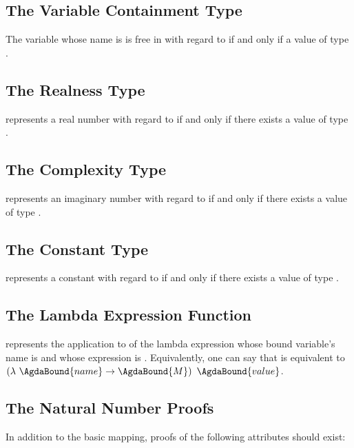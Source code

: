 \documentclass{report}
\begin{document}
\subsection{The Variable Containment Type}
The variable whose name is  is free in  with regard to  if and only if a value of type    .

\subsection{The Realness Type}
 represents a real number with regard to  if and only if there exists a value of type   .

\subsection{The Complexity Type}
 represents an imaginary number with regard to  if and only if there exists a value of type   .

\subsection{The Constant Type}
 represents a constant with regard to  if and only if there exists a value of type   .

\subsection{The Lambda Expression Function}
     represents the application to  of the lambda expression whose bound variable's name is  and whose expression is .  Equivalently, one can say that      is equivalent to \(\left(\lambda\ \AgdaBound{name} \rightarrow \AgdaBound{M}\right)\ \AgdaBound{value}\).

\subsection{The Natural Number Proofs}
In addition to the basic mapping, proofs of the following attributes should exist:
\end{document}
